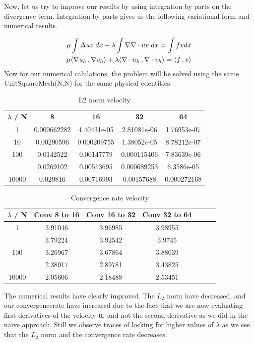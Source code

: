 \documentclass[a4paper,norsk]{article}
\begin{document}
Now, let us try to improve our results by using integration by parts on the divergenve term.
Integration by parts gives us the following variational form and numerical results.

\begin{align*}
\mu \int \Delta u v \hspace{1mm} dx - \lambda \int \nabla \nabla \cdot u v \hspace{1mm} dx = \int f v dx\\
\mu \langle \nabla u_h \,, \nabla v_h \rangle + \lambda \langle \nabla \cdot u_h \,, \nabla \cdot v_h \rangle
= \langle f \,, v \rangle
\end{align*}
Now for our numerical calulations, the problem will be solved using the same
UnitSquareMesh(N,N)  for the same physical edentities.


\begin{table}[ht]
\caption {L2 norm velocity}
\centering
\begin{tabular}{c|cccc}
\hline
\rowcolor{LightCyan}
$\lambda$ / N  & 8 & 16 & 32 & 64\\
\hline
 1     & 0.000662282 & 4.40431e-05 & 2.81081e-06 & 1.76953e-07 \\ \hline
 \rowcolor{LightCyan}
10    & 0.00290596  & 0.000209755 & 1.38052e-05 & 8.78212e-07 \\ \hline
100   & 0.0142522   & 0.00147779  & 0.000115406 & 7.83639e-06 \\ \hline
\rowcolor{LightCyan} \hline
1000  & 0.0269102   & 0.00513695  & 0.000689253 & 6.3586e-05  \\ \hline
10000 & 0.029816    & 0.00716993  & 0.00157688  & 0.000272168 \\
\hline
\end{tabular}
\end{table}

\begin{table}[ht]
\caption {Convergence rate velocity}
\centering
\begin{tabular}{c|cccccc}
\hline
\rowcolor{LightCyan}
$\lambda$ / N  & Conv 8 to 16  &  Conv 16 to 32 &  Conv 32 to 64\\
\hline
1     & 3.91046 & 3.96985 & 3.98955 &  \\ \hline
\rowcolor{LightCyan} \hline
10    & 3.79224 & 3.92542 & 3.9745  &  \\ \hline
100   & 3.26967 & 3.67864 & 3.88039 &  \\ \hline
\rowcolor{LightCyan} \hline
1000  & 2.38917 & 2.89781 & 3.43825 &  \\ \hline
10000 & 2.05606 & 2.18488 & 2.53451 & \\
\hline
\end{tabular}
\end{table}
The numerical results have clearly improved. The $L_2$ norm have decreased, and our convergencerate have increased due
to the fact that we are now evaluating first derivatives of the velocity \textbf{u}, and not the second derivative
as we did in the naive approach. Still we observe traces of locking for higher values of $\lambda$ as we see that the $L_2$
norm and the convergence rate decreases.
\end{document}
